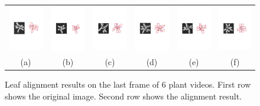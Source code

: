 \begin{figure}
\begin{centering}
\begin{tabular}{c c c c c c}
\includegraphics[width=.14\textwidth]{Figures/AlignPerformance/9_2}&
\includegraphics[width=.14\textwidth]{Figures/AlignPerformance/10_2}&
\includegraphics[width=.14\textwidth]{Figures/AlignPerformance/11_2}&
\includegraphics[width=.14\textwidth]{Figures/AlignPerformance/12_2}&
\includegraphics[width=.14\textwidth]{Figures/AlignPerformance/14_2}&
\includegraphics[width=.14\textwidth]{Figures/AlignPerformance/15_2}\\
(a) & (b) & (c) & (d) & (e) & (f) \\
\end{tabular}
\caption{Leaf alignment results on the last frame of $6$ plant videos. First row shows the original image. Second row shows the alignment result. }
\label{fig:alignResult}
\end{centering}
\end{figure}




